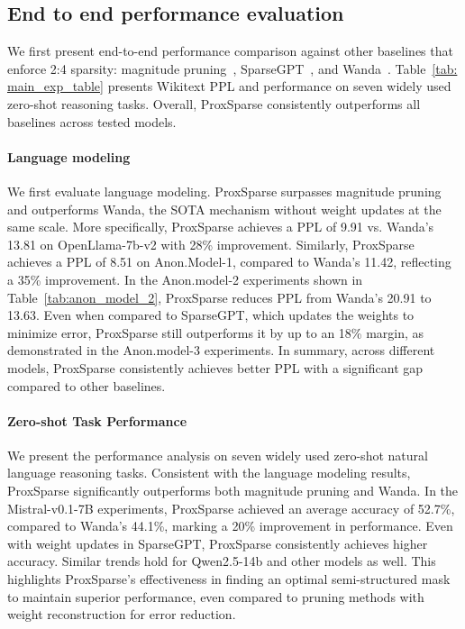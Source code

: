 \subsection{End to end performance evaluation}

\label{end-to-end-eval}


We first present end-to-end performance comparison against other baselines that enforce 2:4 sparsity: magnitude pruning~\cite{han2015deep}, SparseGPT~\cite{frantar2023sparsegpt}, and Wanda~\cite{sun2023simple}. Table~\ref{tab: main_exp_table} presents Wikitext PPL and performance on seven widely used zero-shot reasoning tasks. Overall, ProxSparse consistently outperforms all baselines across tested models.
\paragraph{Language modeling} We first evaluate language modeling. ProxSparse surpasses magnitude pruning and outperforms Wanda, the SOTA mechanism without weight updates at the same scale. More specifically, ProxSparse achieves a PPL of 9.91 vs. Wanda's 13.81 on OpenLlama-7b-v2 with 28\% improvement. Similarly, ProxSparse achieves a PPL of 8.51 on Anon.Model-1, compared to Wanda's 11.42, reflecting a 35\% improvement. In the Anon.model-2 experiments shown in Table~\ref{tab:anon_model_2}, ProxSparse reduces PPL from Wanda's 20.91 to 13.63. 
Even when compared to SparseGPT, which updates the weights to minimize error, ProxSparse still outperforms it by up to an 18\% margin, as demonstrated in the Anon.model-3 experiments. In summary, across different models, ProxSparse consistently achieves better PPL with a significant gap compared to other baselines.
\paragraph{Zero-shot Task Performance} We present the performance analysis on seven widely used zero-shot natural language reasoning tasks. 
Consistent with the language modeling results, ProxSparse significantly outperforms both magnitude pruning and Wanda. In the Mistral-v0.1-7B experiments, ProxSparse achieved an average accuracy of 52.7\%, compared to Wanda’s 44.1\%, marking a 20\% improvement in performance. Even with weight updates in SparseGPT, ProxSparse consistently achieves higher accuracy. Similar trends hold for Qwen2.5-14b and other models as well. This highlights ProxSparse's effectiveness in finding an optimal semi-structured mask to maintain superior performance, even compared to pruning methods with weight reconstruction for error reduction.

